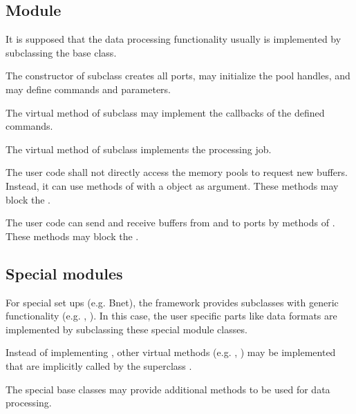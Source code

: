 \subsection{Module}
It is supposed that the data processing functionality usually is implemented by subclassing 
   the  base class. 
\bcir
\item  The constructor of  subclass  creates all 
      ports, may initialize the pool handles, and may 
      define commands and parameters. 
\item  The virtual  method of  
      subclass may implement the callbacks of the defined commands.
\item  The virtual  method of  
      subclass implements the processing job.
\item  The user code shall not directly access the 
      memory pools to request new buffers. Instead, it can use methods of 
       with a  object as argument. 
      These methods may block the .
\item  The user code can send and receive buffers 
      from and to ports by methods of . 
      These methods may block the .
\ecir
\subsection{Special modules}
For special set ups (e.g. Bnet), the framework provides 
    subclasses with generic functionality 
   (e.g. , ). 
   In this case, the user specific parts like data formats are 
   implemented by subclassing these special module classes.
\begin{compactitem}[$\circ$]
\item  Instead of implementing , other virtual 
      methods (e.g. , ) may be 
      implemented that are implicitly called by the superclass .
\item  The special base classes may provide additional 
      methods to be used for data processing.    
\end{compactitem}
